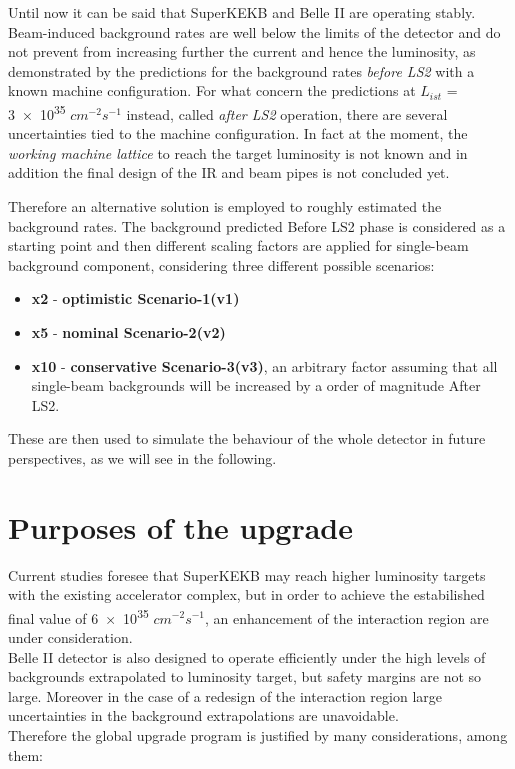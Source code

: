 Until now it can be said that SuperKEKB and Belle II are operating stably. Beam-induced background rates are well below the limits of the detector and do not prevent from increasing further the current and hence the luminosity, as demonstrated by the predictions for the background rates \textit{before LS2} with a known machine configuration. 
For what concern the predictions at \textit{$L_{ist}$} = \num{3e35} $cm^{-2}s^{-1}$ instead, called \textit{after LS2} operation, there are several uncertainties tied to the machine configuration. In fact at the moment, the \emph{working machine lattice} to reach the target luminosity is not known and in addition the final design of the IR and beam pipes is not concluded yet.

Therefore an alternative solution is employed to roughly estimated the background rates. The background predicted Before LS2 phase is considered as a starting point and then different scaling factors are applied for single-beam background component, considering three different possible scenarios:

\begin{itemize}
\item \textbf{x2} - \textbf{optimistic Scenario-1(v1)}
\item \textbf{x5} - \textbf{nominal Scenario-2(v2)}
\item \textbf{x10} - \textbf{conservative Scenario-3(v3)}, an arbitrary factor assuming that all single-beam backgrounds will be increased by a order of magnitude After LS2.
\end{itemize}

These are then used to simulate the behaviour of the whole detector in future perspectives, as we will see in the following.

\section{Purposes of the upgrade}

Current studies foresee that SuperKEKB may reach higher luminosity targets with the existing accelerator complex, but in order to achieve the estabilished final value of  \num{6e35} $cm^{-2} s^{-1}$, an enhancement of the interaction region are under consideration.\\

Belle II detector is also designed to operate efficiently under the high levels of backgrounds extrapolated to luminosity target, but safety margins are not so large. Moreover in the case of a redesign of the interaction region large uncertainties in the background extrapolations are unavoidable. \\
Therefore the global upgrade program is justified by many considerations, among them:

